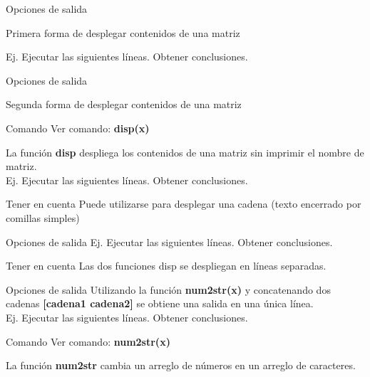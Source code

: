 \documentclass{bredelebeamer}
\begin{document}
\begin{frame}{Opciones de salida}
\begin{center}
Primera forma de desplegar contenidos de una matriz
\end{center}
Ej. Ejecutar las siguientes líneas. Obtener conclusiones.
\end{frame}

\begin{frame}{Opciones de salida}
\begin{center}
Segunda forma de desplegar contenidos de una matriz
\end{center}
\begin{exampleblock}{Comando}
Ver comando: \textbf{disp(x)}
\end{exampleblock}
La función \textbf{disp} despliega los contenidos de una matriz sin imprimir el nombre de matriz.\\
Ej. Ejecutar las siguientes líneas. Obtener conclusiones.
\begin{block}{Tener en cuenta}
Puede utilizarse para desplegar una cadena (texto encerrado por comillas simples)
\end{block}
\end{frame}


\begin{frame}{Opciones de salida}
Ej. Ejecutar las siguientes líneas. Obtener conclusiones.
\begin{block}{Tener en cuenta}
Las dos funciones disp se despliegan en líneas separadas.
\end{block}
\end{frame}

\begin{frame}{Opciones de salida}
Utilizando la función \textbf{num2str(x)} y concatenando dos cadenas \textbf{[cadena1 cadena2]} se obtiene una salida en una única línea.\\
Ej. Ejecutar las siguientes líneas. Obtener conclusiones.
\begin{exampleblock}{Comando}
Ver comando: \textbf{num2str(x)}
\end{exampleblock}
La función \textbf{num2str} cambia un arreglo de números en un arreglo de caracteres.
\end{frame}
\end{document}
